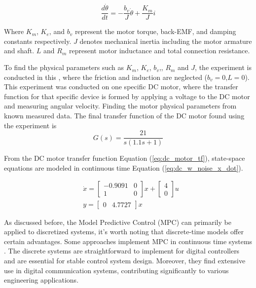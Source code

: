 \begin{equation} \label{eq:dc_motor_dynamics_2}
    \frac{d\dot{\theta}}{dt} = -\frac{b_v}{J} \dot{\theta} + \frac{K_m}{J} i 
\end{equation}


Where $K_m$, $K_e$, and $b_v$ represent the motor torque, back-EMF, and damping constants respectively. $J$ denotes mechanical inertia including the motor armature and shaft. $L$ and $R_m$ represent motor inductance and total connection resistance.

To find the physical parameters such as $K_m$, $K_e$, $b_v$,, $R_m$ and $J$, the experiment is conducted in this \cite{werner2023grt}, where the friction and induction are neglected ($b_v=0$,$L=0$). This experiment was conducted on one specific DC motor, where the transfer function for that specific device is formed by applying a voltage to the DC motor and measuring angular velocity. Finding the motor physical parameters from known measured data. The final transfer function of the DC motor found using the experiment \cite{werner2023grt} is 
\begin{equation} \label{eq:dc_motor_tf}
    G(s) = \frac{21}{s(1.1s + 1)}
\end{equation}

From the DC motor transfer function Equation (\ref{eq:dc_motor_tf}), state-space equations are modeled in continuous time Equation (\ref{eq:dc_w_noise_x_dot}).

\begin{equation} \label{eq:dc_w_noise_x_dot}
\begin{aligned}
        & \dot{x} = \begin{bmatrix}
        -0.9091 & 0 \\ 
        1 & 0
    \end{bmatrix} x + \begin{bmatrix}
        4 \\ 0
    \end{bmatrix} u \\
   & y = \begin{bmatrix}
        0 & 4.7727
    \end{bmatrix} x
\end{aligned}
\end{equation}

As discussed before, the Model Predictive Control (MPC) can primarily be applied to discretized systems, it's worth noting that discrete-time models offer certain advantages. Some approaches implement MPC in continuous time systems \cite{truong2007continuous}. The discrete systems are straightforward to implement for digital controllers and are essential for stable control system design. Moreover, they find extensive use in digital communication systems, contributing significantly to various engineering applications.

